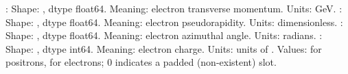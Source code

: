 {}\markdownRendererUlBegin
\markdownRendererUlItem {}:\markdownRendererInterblockSeparator
{}\markdownRendererUlBeginTight
\markdownRendererUlItem Shape: , dtype float64.\markdownRendererUlItemEnd 
\markdownRendererUlItem Meaning: electron transverse momentum.\markdownRendererUlItemEnd 
\markdownRendererUlItem Units: GeV.\markdownRendererUlItemEnd 
\markdownRendererUlEndTight \markdownRendererUlItemEnd 
\markdownRendererUlItem {}:\markdownRendererInterblockSeparator
{}\markdownRendererUlBeginTight
\markdownRendererUlItem Shape: , dtype float64.\markdownRendererUlItemEnd 
\markdownRendererUlItem Meaning: electron pseudorapidity.\markdownRendererUlItemEnd 
\markdownRendererUlItem Units: dimensionless.\markdownRendererUlItemEnd 
\markdownRendererUlEndTight \markdownRendererUlItemEnd 
\markdownRendererUlItem {}:\markdownRendererInterblockSeparator
{}\markdownRendererUlBeginTight
\markdownRendererUlItem Shape: , dtype float64.\markdownRendererUlItemEnd 
\markdownRendererUlItem Meaning: electron azimuthal angle.\markdownRendererUlItemEnd 
\markdownRendererUlItem Units: radians.\markdownRendererUlItemEnd 
\markdownRendererUlEndTight \markdownRendererUlItemEnd 
\markdownRendererUlItem {}:\markdownRendererInterblockSeparator
{}\markdownRendererUlBeginTight
\markdownRendererUlItem Shape: , dtype int64.\markdownRendererUlItemEnd 
\markdownRendererUlItem Meaning: electron charge.\markdownRendererUlItemEnd 
\markdownRendererUlItem Units: units of .\markdownRendererUlItemEnd 
\markdownRendererUlItem Values:  for positrons,  for electrons; 0 indicates a padded (non-existent) slot.\markdownRendererUlItemEnd 
\markdownRendererUlEndTight \markdownRendererUlItemEnd 
\markdownRendererUlEnd \markdownRendererInterblockSeparator
{}
\markdownRendererSectionEnd \markdownRendererSectionBegin
{}\markdownRendererInterblockSeparator
{}\markdownRendererUlBegin
